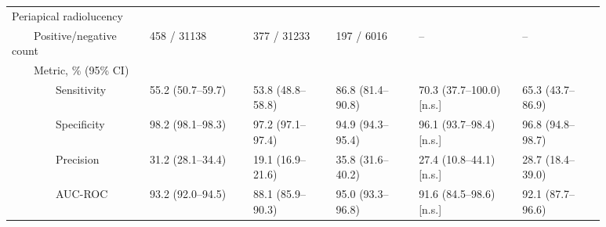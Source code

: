 \begin{table}[!h]
\begin{tabular}{ p{0.2\linewidth}p{0.15\linewidth}p{0.125\linewidth}p{0.125\linewidth}|p{0.15\linewidth}p{0.125\linewidth} }
Periapical radiolucency &   &   &   &   &   \\
{~~~~}Positive/negative count & \num{458} / \num{31138} & \num{377} / \num{31233} & \num{197} / \num{6016} & -- & -- \\
{~~~~}Metric, \% (95\% CI) &   &   &   &   &   \\
{~~~~~~~~}Sensitivity & 55.2 {(50.7--59.7)} & 53.8 {(48.8--58.8)} & 86.8 {(81.4--90.8)} & 70.3 (37.7--100.0) [n.s.] & 65.3 (43.7--86.9) \\
{~~~~~~~~}Specificity & 98.2 {(98.1--98.3)} & 97.2 {(97.1--97.4)} & 94.9 {(94.3--95.4)} & 96.1 (93.7--98.4) [n.s.] & 96.8 (94.8--98.7) \\
{~~~~~~~~}Precision & 31.2 {(28.1--34.4)} & 19.1 {(16.9--21.6)} & 35.8 {(31.6--40.2)} & 27.4 (10.8--44.1) [n.s.] & 28.7 (18.4--39.0) \\
{~~~~~~~~}AUC-ROC & 93.2 {(92.0--94.5)} & 88.1 {(85.9--90.3)} & 95.0 {(93.3--96.8)} & 91.6 (84.5--98.6) [n.s.] & 92.1 (87.7--96.6) \\ \bottomrule
\end{tabular}
\end{table}
